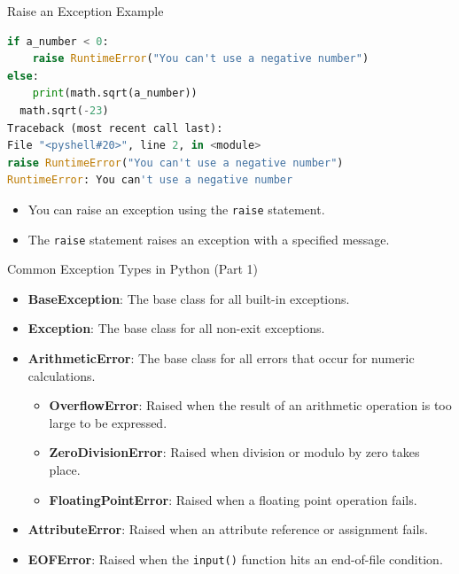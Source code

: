 \begin{frame}[fragile]{Raise an Exception Example}
    \begin{lstlisting}[language=Python]
if a_number < 0:
    raise RuntimeError("You can't use a negative number")
else:
    print(math.sqrt(a_number))
  math.sqrt(-23)
Traceback (most recent call last):
File "<pyshell#20>", line 2, in <module>
raise RuntimeError("You can't use a negative number")
RuntimeError: You can't use a negative number

    \end{lstlisting}
    \begin{itemize}
        \item You can raise an exception using the \texttt{raise} statement.
        \item The \texttt{raise} statement raises an exception with a specified message.
    \end{itemize}
\end{frame} 

\begin{frame}{Common Exception Types in Python (Part 1)}
    \begin{itemize}
        \item \textbf{BaseException}: The base class for all built-in exceptions.
        \item \textbf{Exception}: The base class for all non-exit exceptions.
        \item \textbf{ArithmeticError}: The base class for all errors that occur for numeric calculations.
            \begin{itemize}
                \item \textbf{OverflowError}: Raised when the result of an arithmetic operation is too large to be expressed.
                \item \textbf{ZeroDivisionError}: Raised when division or modulo by zero takes place.
                \item \textbf{FloatingPointError}: Raised when a floating point operation fails.
            \end{itemize}
        \item \textbf{AttributeError}: Raised when an attribute reference or assignment fails.
        \item \textbf{EOFError}: Raised when the \texttt{input()} function hits an end-of-file condition.
    \end{itemize}
\end{frame}

